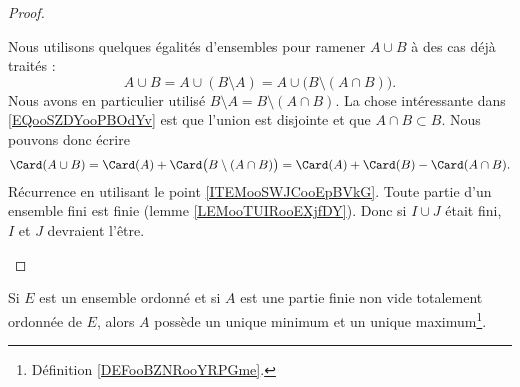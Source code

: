 \begin{proof}
\begin{subproof}
		Nous utilisons quelques égalités d'ensembles pour ramener \( A\cup B\) à des cas déjà traités :
		\begin{equation}        \label{EQooSZDYooPBOdYv}
			A\cup B=A\cup(B\setminus A)=A\cup\big( B\setminus(A\cap B) \big).
		\end{equation}
		Nous avons en particulier utilisé \( B\setminus A=B\setminus(A\cap B)\). La chose intéressante dans \eqref{EQooSZDYooPBOdYv} est que l'union est disjointe et que \( A\cap B\subset B\). Nous pouvons donc écrire
		\begin{equation}
			\Card(A\cup B)=\Card(A)+\Card\big( B\setminus(A\cap B) \big)=\Card(A)+\Card(B)-\Card(A\cap B).
		\end{equation}
		Récurrence en utilisant le point \ref{ITEMooSWJCooEpBVkG}.
		Toute partie d'un ensemble fini est finie (lemme \ref{LEMooTUIRooEXjfDY}). Donc si \( I\cup J\) était fini, \( I\) et \( J\) devraient l'être.
	\end{subproof}
\end{proof}


\begin{lemma}       \label{LEMooPCRFooXRGrUr}
	Si \( E\) est un ensemble ordonné et si \( A\) est une partie finie non vide totalement ordonnée de \( E\), alors \( A\) possède un unique minimum et un unique maximum\footnote{Définition \ref{DEFooBZNRooYRPGme}.}.
\end{lemma}

